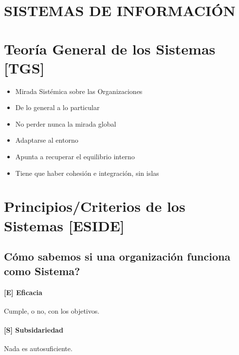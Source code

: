 \twocolumn 

\hypertarget{si}{%
\section{SISTEMAS DE INFORMACIÓN}\label{si}}

\hypertarget{teoruxeda-general-de-los-sistemas}{%
\section{Teoría General de los Sistemas [TGS]}\label{teoruxeda-general-de-los-sistemas}}

\begin{itemize}
  \setlength\itemsep{-1em}
\item   Mirada Sistémica sobre las Organizaciones
\item   De lo general a lo particular
\item   No perder nunca la mirada global
\item   Adaptarse al entorno
\item   Apunta a recuperar el equilibrio interno
\item   Tiene que haber cohesión e integración, sin islas
\end{itemize}


\hypertarget{cuxf3mo-sabemos-si-una-organizaciuxf3n-funciona-como-sistema-principios-eside}{%
\section{Principios/Criterios de los Sistemas
{[}ESIDE{]}}\label{cuxf3mo-sabemos-si-una-organizaciuxf3n-funciona-como-sistema-principios-eside}}

\subsection*{Cómo sabemos si una organización funciona como Sistema?
}

\hypertarget{eficacia}{%
\paragraph{%
{[}E{]}
Eficacia}\label{eficacia}}
Cumple, o no, con los objetivos.

\hypertarget{subsidariedad}{%
\paragraph{%
{[}S{]}
Subsidariedad}\label{subsidariedad}}
Nada es autosuficiente.

